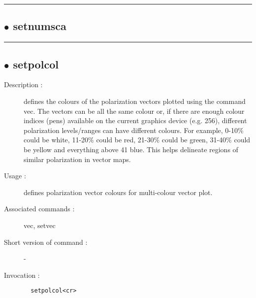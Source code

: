 \hrule \subsection*{$\bullet$ setnumsca}

\hrule \subsection*{$\bullet$ setpolcol}
\begin{description}
\item[Description :] defines the colours of the polarization vectors plotted using
the command vec.  The vectors can be all the same colour or, if there are
enough colour indices (pens) available on the current graphics device
(e.g. 256), different polarization levels/ranges can have different
colours. For example, 0-10\% could be white, 11-20\% could be red, 21-30\%
could be green, 31-40\% could be yellow and everything above 41%
blue.  This helps delineate regions of similar polarization in vector
maps.
\item[Usage :] defines polarization vector colours for multi-colour vector plot.
\item[Associated commands :] vec, setvec
\item[Short version of command :] -
\item[Invocation :]

\verb+  setpolcol<cr> +\end{description}

